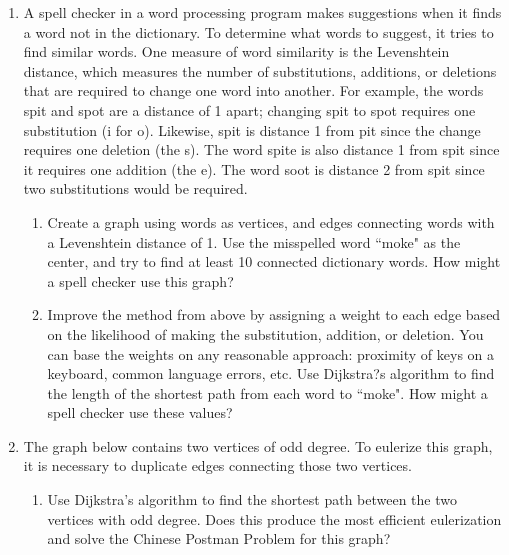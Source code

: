 \begin{enumerate}[start=33]
\item	A spell checker in a word processing program makes suggestions when it finds a word not in the dictionary.  To determine what words to suggest, it tries to find similar words.  One measure of word similarity is the Levenshtein distance, which measures the number of substitutions, additions, or deletions that are required to change one word into another.   For example, the words spit and spot are a distance of 1 apart; changing spit to spot requires one substitution (i for o).   Likewise, spit is distance 1 from pit since the change requires one deletion (the s).  The word spite is also distance 1 from spit since it requires one addition (the e).  The word soot is distance 2 from spit since two substitutions would be required.
\begin{enumerate}
\item	Create a graph using words as vertices, and edges connecting words with a Levenshtein distance of 1.  Use the misspelled word ``moke" as the center, and try to find at least 10 connected dictionary words.  How might a spell checker use this graph?   
\item	Improve the method from above by assigning a weight to each edge based on the likelihood of making the substitution, addition, or deletion.  You can base the weights on any reasonable approach:  proximity of keys on a keyboard, common language errors, etc.  Use Dijkstra?s algorithm to find the length of the shortest path from each word to ``moke".  How might a spell checker use these values?   \\
\end{enumerate}


\item	The graph below contains two vertices of odd degree.  To eulerize this graph, it is necessary to duplicate edges connecting those two vertices.  
\begin{enumerate}
\item	Use Dijkstra's algorithm to find the shortest path between the two vertices with odd degree.  Does this produce the most efficient eulerization and solve the Chinese Postman Problem for this graph?\\

\end{enumerate}
\end{enumerate}
